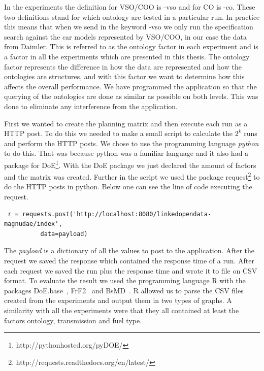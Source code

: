 \documentclass{llncs}
\begin{document}
In the experiments the definition for VSO/COO is \textsf{-vso} and for
CO is \textsf{-co}.  These two definitions stand for which ontology
are tested in a particular run. In practice this means that when we
send in the keyword \textsf{-vso} we only run the specification search
against the car models represented by VSO/COO, in our case the data
from Daimler. This is referred to as the ontology factor in each
experiment and is a factor in all the experiments which are presented
in this thesis. The ontology factor represents the difference in how
the data are represented and how the ontologies are structures, and
with this factor we want to determine how this affects the overall
performance.  We have programmed the application so that the querying
of the ontologies are done as similar as possible on both levels. This
was done to eliminate any interference from the application.

First we wanted to create the planning matrix and
then execute each run as a HTTP post. To do this we needed to make a
small script to calculate the $2^k$ runs and perform the HTTP
posts. We chose to use the programming language \emph{python} to do
this. That was because python was a familiar language and it also had
a package for DoE\footnote{http://pythonhosted.org/pyDOE/}. With the
DoE package we just declared the amount of factors and the matrix was
created.  Further in the script we used the package
\textsf{request}\footnote{http://requests.readthedocs.org/en/latest/}
to do the HTTP posts in python. Below one can see the line of code
executing the request.

\scriptsize\begin{lstlisting}
 r = requests.post('http://localhost:8080/linkedopendata-magnudae/index', 
		  data=payload)
\end{lstlisting}
\normalsize

The \emph{payload} is a dictionary of all the values to post to the
application.  After the request we saved the response which contained
the response time of a run. After each request we saved the run plus
the response time and wrote it to file on CSV format. To evaluate the
result we used the programming language R with the packages
\textsf{DoE.base}~\cite{DoEBase}, \textsf{FrF2}~\cite{FrF2} and
\textsf{BsMD}~\cite{BsMD}. R allowed us to parse the CSV files created
from the experiments and output them in two types of graphs.  A
similarity with all the experiments were that they all contained at
least the factors ontology, transmission and fuel type.
\end{document}
